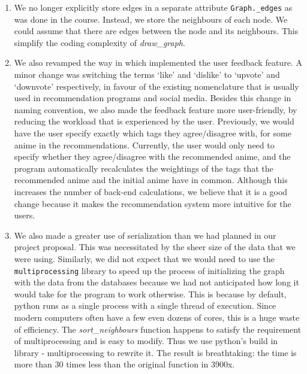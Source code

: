 \documentclass[12pt]{article}
\begin{document}
\begin{enumerate}
\begin{text}
\begin{enumerate}
    \item We no longer explicitly store edges in a separate attribute \texttt{Graph.\_edges} as was done in the course. Instead, we store the neighbours of each node. We could assume that there are edges between the node and its neighbours. This simplify the coding complexity of \textit{draw\_graph}.
    
    \item We also revamped the way in which implemented the user feedback feature. A minor change was switching the terms `like' and `dislike' to `upvote' and `downvote' respectively, in favour of the existing nomenclature that is usually used in recommendation programs and social media. Besides this change in naming convention, we also made the feedback feature more user-friendly, by reducing the workload that is experienced by the user. Previously, we would have the user specify exactly which tags they agree/disagree with, for some anime in the recommendations. Currently, the user would only need to specify whether they agree/disagree with the recommended anime, and the program automatically recalculates the weightings of the tags that the recommended anime and the initial anime have in common. Although this increases the number of back-end calculations, we believe that it is a good change because it makes the recommendation system more intuitive for the users.
    
    \item We also made a greater use of serialization than we had planned in our project proposal. This was necessitated by the sheer size of the data that we were using. Similarly, we did not expect that we would need to use the \texttt{multiprocessing} library to speed up the process of initializing the graph with the data from the databases because we had not anticipated how long it would take for the program to work otherwise. This is because by default, python runs as a single process with a single thread of execution. Since modern computers often have a few even dozens of cores, this is a huge waste of efficiency. The \textit{sort\_neighbours} function happens to satisfy the requirement of multiprocessing and is easy to modify. Thus we use python's build in library - multiprocessing to rewrite it. The result is breathtaking: the time is more than 30 times less than the original function in 3900x.
\end{enumerate}

\end{text}

\newpage


\end{enumerate}
\end{document}
